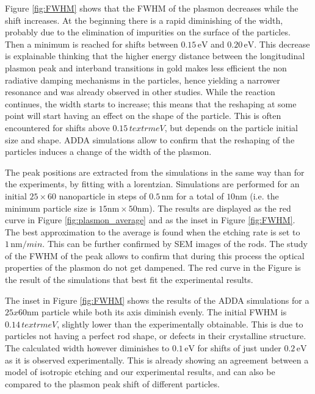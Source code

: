 \documentclass{article}
\begin{document}
Figure \ref{fig:FWHM} shows that the FWHM of the plasmon decreases while the
shift increases. At the beginning there is a rapid diminishing of the width,
probably due to the elimination of impurities on the surface of the particles.
Then a minimum is reached for shifts between $0.15\,\textrm{eV}$ and
$0.20\,\textrm{eV}$. This decrease is explainable thinking that the higher 
energy distance between the longitudinal plasmon peak and interband transitions
in gold makes less efficient the non radiative damping mechanisms in the
particles, hence yielding a narrower resonance and was already observed in
other studies\cite{Sonnichsen2002}. While the reaction continues, the width
starts to increase; this means that the reshaping at some point will start having an
effect on the shape of the particle. This is often encountered for shifts above
$0.15\,textrm{eV}$, but depends on the particle initial size and shape. ADDA
simulations allow to confirm that the reshaping of the particles induces a
change of the width of the plasmon.


The peak positions are extracted from the simulations in the same way than for
the experiments, by fitting with a lorentzian. Simulations are performed for an
initial $25\times60$ nanoparticle in steps of $0.5\,\textrm{nm}$ for a total of
$10\textrm{nm}$ (i.e. the minimum particle size is $15\textrm{nm}\times 50
\textrm{nm}$). The results are displayed as the red curve in Figure
\ref{fig:plasmon_average} and as the inset in Figure \ref{fig:FWHM}. The best
approximation to the average is found when the etching rate is set to
$1\,\textrm{nm}/min$. This can be further confirmed by SEM images of the rods.
The study of the FWHM of the peak allows to confirm that during this process the
optical properties of the plasmon do not get dampened.
The red curve in the Figure is the result of the simulations that best
fit the experimental results.




The inset in Figure \ref{fig:FWHM} shows the results of the
ADDA\cite{Yurkin2011} simulations for a $25x60$nm particle while both its axis
diminish evenly. The initial FWHM is $0.14\,textrm{eV}$, slightly lower
than the experimentally obtainable. This is due to particles not having a
perfect rod shape, or defects in their crystalline structure. The calculated
width however diminishes to $0.1\,\textrm{eV}$ for shifts of just under
$0.2\,\textrm{eV}$ as it is observed experimentally. This is already showing an
agreement between a model of isotropic etching and our experimental results, and
can also be compared to the plasmon peak shift of different particles.
\end{document}
